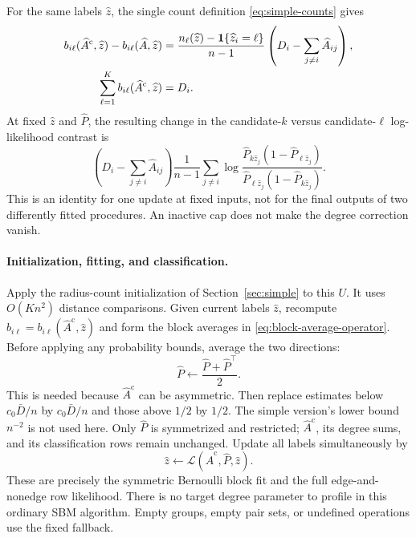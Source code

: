For the same labels $\widehat z$, the single count definition
\eqref{eq:simple-counts} gives
\begin{equation}\label{eq:count-bridge}
 \begin{aligned}
 b_{i\ell}(\widehat A^{\mathrm{c}},\widehat z)-b_{i\ell}(\widehat A,\widehat z)
 &=\frac{n_\ell(\widehat z)-\mathbf1\{\widehat z_i=\ell\}}{n-1}
     \left(D_i-\sum_{j\ne i}\widehat A_{ij}\right),\\
 \sum_{\ell=1}^K b_{i\ell}(\widehat A^{\mathrm{c}},\widehat z)&=D_i.
 \end{aligned}
\end{equation}
At fixed $\widehat z$ and $\widehat P$, the resulting change in the
candidate-$k$ versus candidate-$\ell$ log-likelihood contrast is
\begin{equation}\label{eq:score-bridge}
 \left(D_i-\sum_{j\ne i}\widehat A_{ij}\right)
 \frac1{n-1}\sum_{j\ne i}
 \log\frac{\widehat P_{k\widehat z_j}(1-\widehat P_{\ell \widehat z_j})}
               {\widehat P_{\ell \widehat z_j}(1-\widehat P_{k\widehat z_j})}.
\end{equation}
This is an identity for one update at fixed inputs, not for the final
outputs of two differently fitted procedures. An inactive cap does
not make the degree correction vanish.

\paragraph{Initialization, fitting, and classification.}
Apply the radius-count initialization of Section~\ref{sec:simple} to
this $U$. It uses $O(Kn^2)$ distance comparisons. Given current labels
$\widehat z$, recompute $b_{i\ell}=b_{i\ell}(\widehat A^{\mathrm{c}},\widehat z)$
and form the block averages in \eqref{eq:block-average-operator}.
Before applying any probability bounds, average the two directions:
\begin{equation}\label{eq:block-fit}
 \widehat P\leftarrow\frac{\widehat P+\widehat P^\top}{2}.
\end{equation}
This is needed because $\widehat A^{\mathrm{c}}$ can be asymmetric.
Then replace estimates below $c_0\bar D/n$ by $c_0\bar D/n$ and
those above $1/2$ by $1/2$. The simple version's lower bound $n^{-2}$
is not used here. Only $\widehat P$ is symmetrized and restricted;
$\widehat A^{\mathrm{c}}$, its degree sums, and its classification
rows remain unchanged.
Update all labels simultaneously by
\begin{equation}\label{eq:fitted-row-score}
 \widehat z\leftarrow\mathcal L(\widehat A^{\mathrm{c}},\widehat P,\widehat z).
\end{equation}
These are precisely the symmetric Bernoulli block fit and the full
edge-and-nonedge row likelihood. There is no target degree parameter
to profile in this ordinary SBM algorithm. Empty groups, empty pair
sets, or undefined operations use the fixed fallback.

